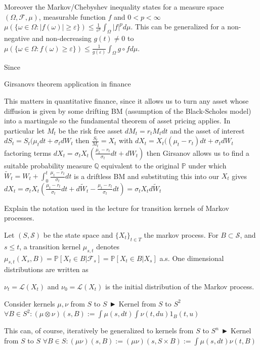 Moreover the Markov/Chebyshev inequality states for a measure space \((\Omega, \mathcal{F}, \mu)\), measurable function \( f \)
and \( 0 < p < \infty \)
\( \mu(\{\omega \in \Omega : |f(\omega)| \geq \varepsilon\}) \leq \frac{1}{\varepsilon^p}\int_\Omega |f|^p d\mu \).
This can be generalized for a non-negative and non-decreasing \( g(t) \neq 0 \) to 
\( \mu(\{\omega \in \Omega : f(\omega) \geq \varepsilon\}) \leq \frac{1}{g(\varepsilon)}\int_\Omega g \circ f d\mu \).

Since 


Girsanovs theorem application in finance

This matters in quantitative finance, since it allows us to turn any 
asset whose diffusion is given by some drifting BM (assumption of the Black-Scholes model) 
into a martingale so the fundamental theorem of asset pricing applies.
In particular let \( M_t \) be the risk free asset \( dM_t = r_t M_t dt \)
and the asset of interest \( dS_t = S_t(\mu_t dt + \sigma_t dW_t \)
then \( \frac{S_t}{M_t} = X_t\)
with \( dX_t = X_t((\mu_t - r_t)dt + \sigma_t dW_t \)
factoring terms \( dX_t = \sigma_t X_t(\frac{\mu_t - r_t}{\sigma_t}dt + dW_t) \)
then Girsanov allows us to find a suitable probability measure \( \mathbb{Q} \)
equivalent to the original \( \mathbb{P} \) under which
\( \tilde{W}_t = W_t + \int_{0}^{t}\frac{\mu_t - r_t}{\sigma_t} dt \)
is a driftless BM and substituting this into our \( X_t \) gives
\( dX_t = \sigma_t X_t(\frac{\mu_t - r_t}{\sigma_t}dt + d\tilde{W}_t - \frac{\mu_t - r_t}{\sigma_t}dt) = \sigma_t X_t d\tilde{W}_t \)


Explain the notation used in the lecture for transition kernels of Markov processes.

Let \( (S,\mathcal{S}) \) be the state space and \( \{X_t\}_{t \in T}\) the markov process.
For \( B \subset \mathcal{S} \), and \( s \leq t \), a transition kernel \( \mu_{s,t} \)
denotes
\( \mu_{s,t}(X_s, B) = \mathbb{P}[X_t \in B|\mathcal{F}_s] = \mathbb{P}[X_t \in B|X_s] \) a.s.
One dimensional distributions are written as

\( \nu_t = \mathcal{L}(X_t) \) and \( \nu_0 = \mathcal{L}(X_t) \) is the initial distribution of the Markov process.

Consider kernels \(\mu, \nu\) from \(S\) to \(S\) 
► Kernel from \(S\) to \(S^2\)
\(\forall B \in S^2: (\mu \otimes \nu)(s, B) := \int \mu(s, dt) \int \nu(t, du) 1_B(t, u)\)

This can, of course, iteratively be generalized to kernels from \(S\) to \(S^n\)
► Kernel from \(S\) to \(S\)
\(\forall B \in S: (\mu \nu)(s, B) := (\mu \nu)(s, S \times B) := \int \mu(s, dt) \nu(t, B)\)

